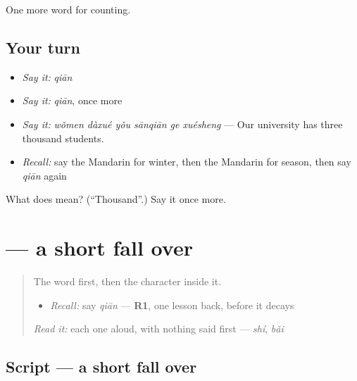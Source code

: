 \begin{grammarlens}[title={What you've built}]
One more word for counting.
\end{grammarlens}

\subsection*{Your turn}
\begin{itemize}
\raggedright
  \item \emph{Say it:} \emph{qiān}
  \item \emph{Say it:} \emph{qiān}, once more
  \item \emph{Say it:} \emph{wǒmen dàxué yǒu sānqiān ge xuésheng} — Our university has three thousand students.
  \item \emph{Recall:} say the Mandarin for winter, then the Mandarin for season, then say \emph{qiān} again
\end{itemize}

\begin{tcolorbox}[breakable,colback=teal!4,colframe=teal!35!black,title={Before you move on}]
What does  mean? (\textquotedblleft{}Thousand\textquotedblright{}.) Say it once more.
\end{tcolorbox}
\section[\texorpdfstring{\zh{千} (qiān)}{千 (qiān)}]{ — a short fall over }

\label{lesson:ZH-W132-qian-thousand}



\begin{quote}
The word first, then the character inside it.

\begin{itemize}
\raggedright
  \item \emph{Recall:} say \emph{qiān} — \textbf{R1}, one lesson back, before it decays
\end{itemize}

\begin{quote}
 
\end{quote}

\emph{Read it:} each one aloud, with nothing said first — \emph{shí}, \emph{bǎi}
\end{quote}

\subsection*{Script — a short fall over }

